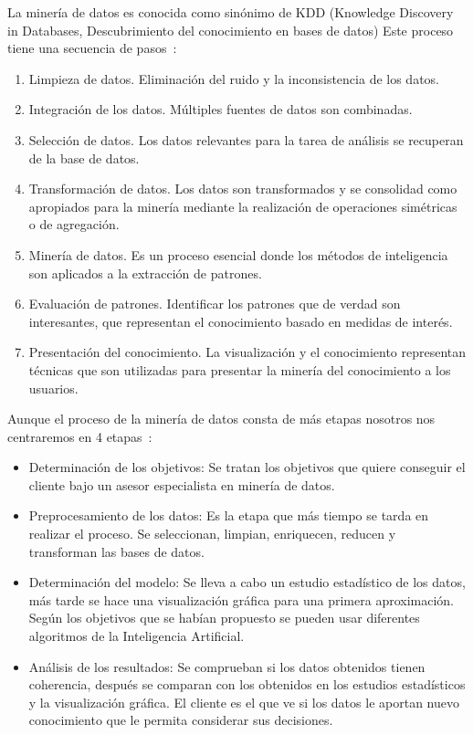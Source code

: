La minería de datos es conocida como sinónimo de KDD (Knowledge Discovery in Databases, Descubrimiento del conocimiento en bases de datos) Este proceso tiene una secuencia de pasos~\cite{mineria_KDD}:

\begin{enumerate}[1.]
	\item Limpieza de datos. Eliminación del ruido y la inconsistencia de los datos.
	\item Integración de los datos. Múltiples fuentes de datos son combinadas.
	\item Selección de datos. Los datos relevantes para la tarea de análisis se recuperan de la base de datos.
	\item Transformación de datos. Los datos son transformados y se consolidad como apropiados para la minería mediante la realización de operaciones simétricas o de agregación.
	\item Minería de datos. Es un proceso esencial donde los métodos de inteligencia son aplicados a la extracción de patrones.
	\item Evaluación de patrones. Identificar los patrones que de verdad son interesantes, que representan el conocimiento basado en medidas de interés.
	\item Presentación del conocimiento. La visualización y el conocimiento representan técnicas que son utilizadas para presentar la minería del conocimiento a los usuarios.
\end{enumerate}

Aunque el proceso de la minería de datos consta de más etapas nosotros nos centraremos en 4 etapas~\cite{datamining}:
\begin{itemize}
	\item Determinación de los objetivos: Se tratan los objetivos que quiere conseguir el cliente bajo un asesor especialista en minería de datos.
	\item Preprocesamiento de los datos: Es la etapa que más tiempo se tarda en realizar el proceso. Se seleccionan, limpian, enriquecen, reducen y transforman las bases de datos.
	\item Determinación del modelo: Se lleva a cabo un estudio estadístico de los datos, más tarde se hace una visualización gráfica para una primera aproximación. Según los objetivos que se habían propuesto se pueden usar diferentes algoritmos de la Inteligencia Artificial.
	\item  Análisis de los resultados: Se comprueban si los datos obtenidos tienen coherencia, después se comparan con los obtenidos en los estudios estadísticos y la visualización gráfica. El cliente es el que ve si los datos le aportan nuevo conocimiento que le permita considerar sus decisiones.
\end{itemize}

